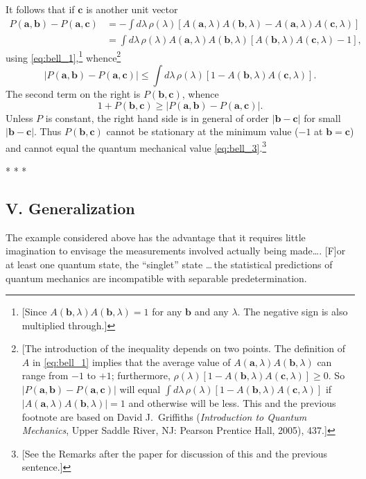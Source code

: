 It follows that if $\pmb{c}$ is another unit vector
\begin{align*}
P(\pmb{a}, \pmb{b}) - P(\pmb{a}, \pmb{c}) &= - \int d\lambda\, \rho(\lambda) [A(\pmb{a}, \lambda) A(\pmb{b}, \lambda) - A(\pmb{a}, \lambda) A(\pmb{c}, \lambda)] \\
 &= \int d\lambda\, \rho(\lambda) A(\pmb{a}, \lambda) A(\pmb{b}, \lambda) [A(\pmb{b}, \lambda) A(\pmb{c}, \lambda)-1],
\end{align*}
using \eqref{eq:bell_1},\footnote{[Since $A(\pmb{b},\lambda)A(\pmb{b},\lambda)=1$ for any $\pmb{b}$ and any $\lambda$. The negative sign is also multiplied through.]}%
%
whence\footnote{[The introduction of the inequality depends on two points. The definition of $A$ in \eqref{eq:bell_1} implies that the average value of $A(\pmb{a}, \lambda) A(\pmb{b}, \lambda)$ can range from $-1$ to $+1$; furthermore, $\rho(\lambda)[1 - A(\pmb{b}, \lambda) A(\pmb{c}, \lambda)] \geq 0$. So $|P(\pmb{a}, \pmb{b}) - P(\pmb{a}, \pmb{c})|$ will equal $\int d\lambda\, \rho(\lambda) [1 - A(\pmb{b}, \lambda) A(\pmb{c}, \lambda)]$ if $|A(\pmb{a}, \lambda) A(\pmb{b}, \lambda)|= 1$ and otherwise will be less. This and the previous footnote are based on David J.\ Griffiths (\emph{Introduction to Quantum Mechanics}, Upper Saddle River, NJ: Pearson Prentice Hall, 2005), 437.]}
\begin{equation*}
|P(\pmb{a}, \pmb{b}) - P(\pmb{a}, \pmb{c})| \leq \int d\lambda\, \rho(\lambda) [1 - A(\pmb{b}, \lambda) A(\pmb{c}, \lambda)].
\end{equation*}
The second term on the right is $P(\pmb{b}, \pmb{c})$, whence
\begin{equation}
1 + P(\pmb{b}, \pmb{c}) \geq |P(\pmb{a}, \pmb{b}) - P(\pmb{a}, \pmb{c})|.
\end{equation}
Unless $P$ is constant, the right hand side is in general of order $|\pmb{b}-\pmb{c}|$ for small $|\pmb{b}-\pmb{c}|$. Thus $P(\pmb{b}, \pmb{c})$
cannot be stationary at the minimum value ($-1$ at $\pmb{b} = \pmb{c}$) and cannot 
equal the quantum mechanical value \eqref{eq:bell_3}.\footnote{[See the Remarks after the paper for discussion of this and the previous sentence.]}\\
\centerline{* * *}

\subsection*{V. Generalization}
The example considered above has the advantage that it requires little imagination to envisage the
measurements involved actually being made\ldots. [F]or at least one quantum state, the ``singlet'' state \ldots\,the 
statistical predictions of quantum mechanics are incompatible with separable predetermination.

